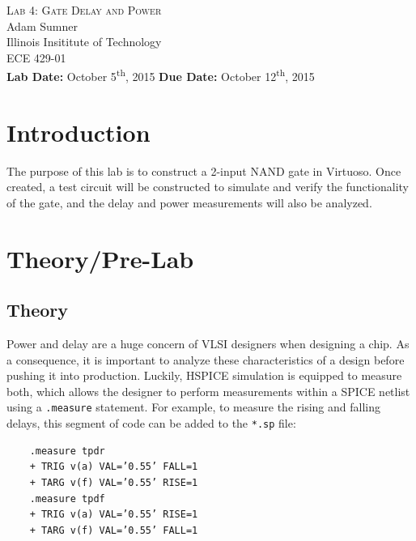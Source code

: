 \documentclass[12pt]{article}
\begin{document}
\begin{titlepage}
	\begin{center}
		
		
		\vfill
		
		\textsc{\LARGE Lab 4: Gate Delay and Power}\\[1.5cm]
		
		\Large Adam Sumner\\[0.5cm]
		
		\Large Illinois Insititute of Technology\\[0.5cm]
		
		\Large ECE 429-01\\[0.5cm]	
		
		\noindent
		\vfill
		\large \textbf{Lab Date:} October 5\textsuperscript{th}, 2015\hfill
		\large \textbf{Due Date:} October 12\textsuperscript{th}, 2015
	
		
	\end{center}
\end{titlepage}

\section{Introduction}
The purpose of this lab is to construct a 2-input NAND gate in Virtuoso. Once created, a test circuit will be constructed to simulate and verify the functionality of the gate, and the delay and power measurements will also be analyzed. 
\section{Theory/Pre-Lab}
\subsection{Theory}
Power and delay are a huge concern of VLSI designers when designing a chip. As a consequence, it is important to analyze these characteristics of a design before pushing it into production. Luckily, HSPICE simulation is equipped to measure both, which allows the designer to perform measurements within a SPICE netlist using a \texttt{.measure} statement. For example, to measure the rising and falling delays, this segment of code can be added to the \texttt{*.sp} file: 
\begin{lstlisting}
	.measure tpdr
	+ TRIG v(a) VAL=’0.55’ FALL=1
	+ TARG v(f) VAL=’0.55’ RISE=1
	.measure tpdf
	+ TRIG v(a) VAL=’0.55’ RISE=1
	+ TARG v(f) VAL=’0.55’ FALL=1
\end{lstlisting}
\end{document}
